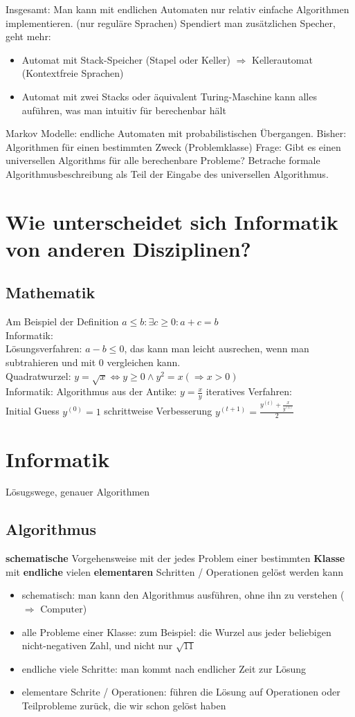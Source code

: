 \documentclass[a4paper]{scrartcl}
\begin{document}
Insgesamt: Man kann mit endlichen Automaten nur relativ einfache Algorithmen implementieren. (nur reguläre Sprachen)
Spendiert man zusätzlichen Specher, geht mehr:
\begin{itemize}
\item Automat mit Stack-Speicher (Stapel oder Keller) $\Rightarrow$ Kellerautomat (Kontextfreie Sprachen)
\item Automat mit zwei Stacks oder äquivalent Turing-Maschine kann alles auführen, was man intuitiv für berechenbar hält
\end{itemize}
Markov Modelle: endliche Automaten mit probabilistischen Übergangen.
Bisher: Algorithmen für einen bestimmten Zweck (Problemklasse)
Frage: Gibt es einen universellen Algorithms für alle berechenbare Probleme?
Betrache formale Algorithmusbeschreibung als Teil der Eingabe des universellen Algorithmus.
\section{Wie unterscheidet sich Informatik von anderen Disziplinen?}
\label{sec-4}
\subsection{Mathematik}
\label{sec-4-1}
Am Beispiel der Definition $a \leq b: \exists c \geq 0: a + c = b$ \\
   Informatik: \\
   Lösungsverfahren: $a - b \leq 0$, das kann man leicht ausrechen, wenn man subtrahieren und mit $0$ vergleichen kann. \\
   Quadratwurzel: $y = \sqrt{x} \Leftrightarrow y \geq 0 \wedge y^2 = x (\Rightarrow x > 0)$ \\
   Informatik: Algorithmus aus der Antike: $y = \frac{x}{y}$
iteratives Verfahren: \\
   Initial Guess $y^{(0)} = 1$
schrittweise Verbesserung $y^{(t+1)} = \frac{y^{(t)} + \frac{x}{y^{(t)}}}{2}$
\section{Informatik}
\label{sec-5}
Lösugswege, genauer Algorithmen
\subsection{Algorithmus}
\label{sec-5-1}
\textbf{schematische} Vorgehensweise mit der jedes Problem einer bestimmten \textbf{Klasse} mit \textbf{endliche} vielen \textbf{elementaren} Schritten / Operationen gelöst werden kann
\begin{itemize}
\item schematisch: man kann den Algorithmus ausführen, ohne ihn zu verstehen ($\Rightarrow$ Computer)
\item alle Probleme einer Klasse: zum Beispiel: die Wurzel aus jeder beliebigen nicht-negativen Zahl, und nicht nur $\sqrt{11}$
\item endliche viele Schritte: man kommt nach endlicher Zeit zur Lösung
\item elementare Schrite / Operationen: führen die Lösung auf Operationen oder Teilprobleme zurück, die wir schon gelöst haben
\end{itemize}
\end{document}
